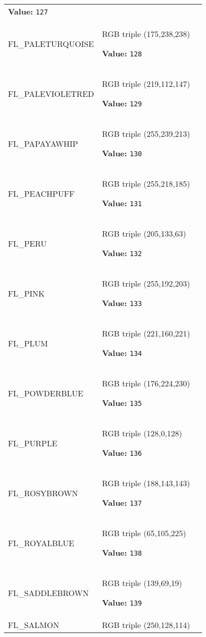 \begin{longtable}{|p{\varnamewidth}|p{\vardescrwidth}|l}
\textbf{Value:} 
{\tt 127}&\\
\cline{1-2}
\raggedright F\-L\-\_\-P\-A\-L\-E\-T\-U\-R\-Q\-U\-O\-I\-S\-E\- & \raggedright RGB triple (175,238,238)

\textbf{Value:} 
{\tt 128}&\\
\cline{1-2}
\raggedright F\-L\-\_\-P\-A\-L\-E\-V\-I\-O\-L\-E\-T\-R\-E\-D\- & \raggedright RGB triple (219,112,147)

\textbf{Value:} 
{\tt 129}&\\
\cline{1-2}
\raggedright F\-L\-\_\-P\-A\-P\-A\-Y\-A\-W\-H\-I\-P\- & \raggedright RGB triple (255,239,213)

\textbf{Value:} 
{\tt 130}&\\
\cline{1-2}
\raggedright F\-L\-\_\-P\-E\-A\-C\-H\-P\-U\-F\-F\- & \raggedright RGB triple (255,218,185)

\textbf{Value:} 
{\tt 131}&\\
\cline{1-2}
\raggedright F\-L\-\_\-P\-E\-R\-U\- & \raggedright RGB triple (205,133,63)

\textbf{Value:} 
{\tt 132}&\\
\cline{1-2}
\raggedright F\-L\-\_\-P\-I\-N\-K\- & \raggedright RGB triple (255,192,203)

\textbf{Value:} 
{\tt 133}&\\
\cline{1-2}
\raggedright F\-L\-\_\-P\-L\-U\-M\- & \raggedright RGB triple (221,160,221)

\textbf{Value:} 
{\tt 134}&\\
\cline{1-2}
\raggedright F\-L\-\_\-P\-O\-W\-D\-E\-R\-B\-L\-U\-E\- & \raggedright RGB triple (176,224,230)

\textbf{Value:} 
{\tt 135}&\\
\cline{1-2}
\raggedright F\-L\-\_\-P\-U\-R\-P\-L\-E\- & \raggedright RGB triple (128,0,128)

\textbf{Value:} 
{\tt 136}&\\
\cline{1-2}
\raggedright F\-L\-\_\-R\-O\-S\-Y\-B\-R\-O\-W\-N\- & \raggedright RGB triple (188,143,143)

\textbf{Value:} 
{\tt 137}&\\
\cline{1-2}
\raggedright F\-L\-\_\-R\-O\-Y\-A\-L\-B\-L\-U\-E\- & \raggedright RGB triple (65,105,225)

\textbf{Value:} 
{\tt 138}&\\
\cline{1-2}
\raggedright F\-L\-\_\-S\-A\-D\-D\-L\-E\-B\-R\-O\-W\-N\- & \raggedright RGB triple (139,69,19)

\textbf{Value:} 
{\tt 139}&\\
\cline{1-2}
\raggedright F\-L\-\_\-S\-A\-L\-M\-O\-N\- & \raggedright RGB triple (250,128,114)


\end{longtable}
